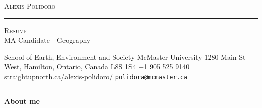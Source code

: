 \documentclass[10pt,a4paper,]{article}
\renewcommand{\section}[1]
{
	\begin{center}
		\large\textcolor{sectcol}{\textbf{#1}}
	\end{center}
}
\newcommand{\metasection}[2]
{
\footnotesize{#2} \hspace*{\fill} \footnotesize{#1}\\[1pt]
}
\begin{document}
\pagestyle{fancy}






\vspace{-8pt}
\begin{center}
	\HUGE \textsc{Alexis Polidoro} \textcolor{sectcol}{\rule[-1mm]{1mm}{0.9cm}} \textsc{Resume}\\[2pt]
	\small MA Candidate - Geography
\end{center}


\vspace{6pt}


\metasection{ +1 905 525
9140}{ \textbar{} School of Earth, Environment and
Society \textbar{} McMaster University \textbar{} 1280 Main St West,
Hamilton, Ontario, Canada L8S 1S4}
\metasection{ \href{mailto:polidora@mcmaster.ca}{\nolinkurl{polidora@mcmaster.ca}}}{\faicon{home} \href{http://straightupnorth.ca/alexis-polidoro/}{straightupnorth.ca/alexis-polidoro/}}
\vspace{-2pt}
\textcolor{softcol}{\hrule}
\vspace{6pt}

\normalsize



%
%



\hypertarget{about-me}{%
\section{About me}\label{about-me}}
\end{document}
